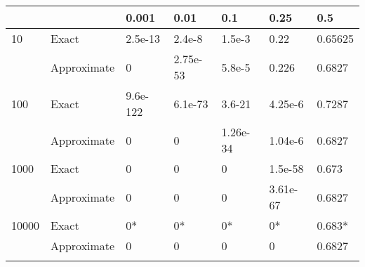 \documentclass{article}
\begin{document}
\begin{table}
        \begin{tabular}{lllllll}\toprule
            && 0.001 & 0.01 & 0.1 & 0.25 & 0.5 \\\midrule
            10 & Exact & 2.5e-13 & 2.4e-8 & 1.5e-3 & 0.22 & 0.65625 \\
               & Approximate & 0 & 2.75e-53 & 5.8e-5 & 0.226 & 0.6827 \\
            100 & Exact & 9.6e-122 & 6.1e-73 & 3.6-21 & 4.25e-6 & 0.7287 \\
                & Approximate & 0 & 0 & 1.26e-34 & 1.04e-6 & 0.6827 \\
            1000 & Exact & 0 & 0 & 0 & 1.5e-58 & 0.673 \\
                & Approximate & 0 & 0 & 0 & 3.61e-67 & 0.6827 \\
            10000 & Exact & 0* & 0* & 0* & 0* & 0.683* \\
                & Approximate & 0 & 0 & 0 & 0 & 0.6827 \\
            \\\bottomrule
        \end{tabular}
\end{table}
\end{document}
